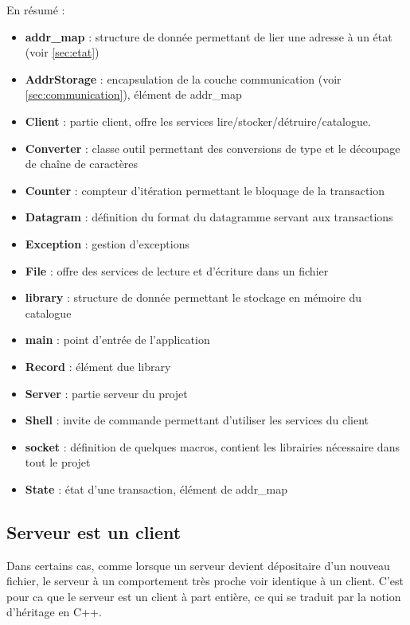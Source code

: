 \documentclass[10pt,a4paper]{article}
\begin{document}
En résumé :
\begin{itemize}
 \item \textbf{addr\_map} : structure de donnée permettant de lier une adresse à un état (voir \ref{sec:etat})
 \item \textbf{AddrStorage} : encapsulation de la couche communication (voir \ref{sec:communication}), élément de addr\_map
 \item \textbf{Client} : partie client, offre les services lire/stocker/détruire/catalogue.
 \item \textbf{Converter} : classe outil permettant des conversions de type et le découpage de chaîne de caractères
 \item \textbf{Counter} : compteur d'itération permettant le bloquage de la transaction
 \item \textbf{Datagram} : définition du format du datagramme servant aux transactions
 \item \textbf{Exception} : gestion d'exceptions
 \item \textbf{File} : offre des services de lecture et d'écriture dans un fichier
 \item \textbf{library} : structure de donnée permettant le stockage en mémoire du catalogue
 \item \textbf{main} : point d'entrée de l'application
 \item \textbf{Record} : élément due library
 \item \textbf{Server} : partie serveur du projet
 \item \textbf{Shell} : invite de commande permettant d'utiliser les services du client
 \item \textbf{socket} : définition de quelques macros, contient les librairies nécessaire dans tout le projet
 \item \textbf{State} : état d'une transaction, élément de addr\_map
\end{itemize}


\subsection{Serveur est un client}
Dans certains cas, comme lorsque un serveur devient dépositaire d'un nouveau fichier, le serveur à un comportement très proche voir identique à un client. C'est pour ca que le serveur est un client à part entière, ce qui se traduit par la notion d'héritage en C++.
\end{document}
